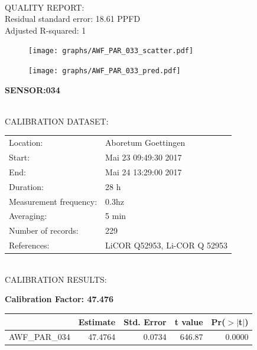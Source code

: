 \documentclass[oneside]{report}
\begin{document}
\hrulefill\\
QUALITY REPORT:\\
Residual standard error: 18.61 PPFD\\
Adjusted R-squared: 1



\begin{figure}[H]
  \centering
  \texttt{[image: graphs/AWF\_PAR\_033\_scatter.pdf]}
\end{figure}




\begin{figure}[H]
  \centering
  \texttt{[image: graphs/AWF\_PAR\_033\_pred.pdf]}
\end{figure}

\pagebreak


\begin{center}
\large{\textbf{SENSOR:034}}\\
\end{center}

\hrulefill\\
CALIBRATION DATASET:\\
\begin{table}[h!]
  \centering
  \label{tab:table1}
  \begin{tabular}{ll}
    Location: & Aboretum Goettingen\\ 
    
    
    Start:  & Mai 23 09:49:30 2017 \\
    End:   & Mai 24 13:29:00 2017\\ 
    Duration: & 28 h\\
    Measurement frequency: & 0.3hz\\
    Averaging:  &5 min\\
    Number of records: & 229 \\
    References: & LiCOR Q52953, Li-COR Q 52953 \\
  \end{tabular}
\end{table}

\hrulefill\\
CALIBRATION RESULTS:\\


\begin{center}
\textbf{\large{Calibration Factor: 47.476}}\\
\end{center}
\begin{table}[ht]
\centering
\begin{tabular}{rrrrr}
  \hline
 & Estimate & Std. Error & t value & Pr($>$$|$t$|$) \\ 
  \hline
AWF\_PAR\_034 & 47.4764 & 0.0734 & 646.87 & 0.0000 \\ 
   \hline
\end{tabular}
\end{table}
\end{document}
